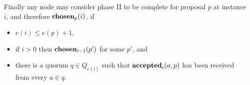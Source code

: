 \documentclass[journal]{IEEEtran}
\begin{document}
Finally any node may consider phase II to be complete for proposal $p$ at instance
$i$, and therefore $\mathbf{chosen}_{p}(i)$, if
\begin{itemize}
\item $e(i) \le e(p) + 1$,
\item if $i > 0$ then $\mathbf{chosen}_{i-1}(p')$ for some $p'$, and
\item there is a quorum $q \in
Q_{e(i)}$ such that $\mathbf{accepted}_{i}(a,p)$ has been received from every $a \in q$.
\end{itemize}



%
%



%
%
\end{document}
